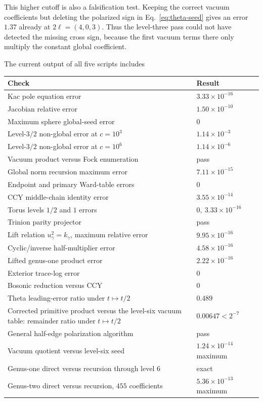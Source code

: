 \documentclass[11pt]{article}
\begin{document}
This higher cutoff is also a falsification test.  Keeping the correct vacuum
coefficients but deleting the polarized sign in
Eq.~\eqref{eq:theta-seed} gives an error \(1.37\) already at
\(2\bm\ell=(4,0,3)\).  Thus the level-three pass could not have detected the
missing cross sign, because the first vacuum terms there only multiply the
constant global coefficient.

The current output of all five scripts includes
\begin{center}
\begin{tabular}{@{}L{0.67\textwidth}l@{}}
\toprule
Check & Result\\
\midrule
Kac pole equation error & \(3.33\times10^{-16}\)\\
Jacobian relative error & \(1.50\times10^{-10}\)\\
Maximum sphere global-seed error & \(0\)\\
Level-\(3/2\) non-global error at \(c=10^3\) & \(1.14\times10^{-3}\)\\
Level-\(3/2\) non-global error at \(c=10^6\) & \(1.14\times10^{-6}\)\\
Vacuum product versus Fock enumeration & pass\\
Global norm recursion maximum error & \(7.11\times10^{-15}\)\\
Endpoint and primary Ward-table errors & \(0\)\\
CCY middle-chain identity error & \(3.55\times10^{-14}\)\\
Torus levels \(1/2\) and \(1\) errors
& \(0,\ 3.33\times10^{-16}\)\\
Trinion parity projector & pass\\
Lift relation \(u_\gamma^2=k_\gamma\), maximum relative error
& \(9.95\times10^{-16}\)\\
Cyclic/inverse half-multiplier error & \(4.58\times10^{-16}\)\\
Lifted genus-one product error & \(2.22\times10^{-16}\)\\
Exterior trace-log error & \(0\)\\
Bosonic reduction versus CCY & \(0\)\\
Theta leading-error ratio under \(t\mapsto t/2\) & \(0.489\)\\
Corrected primitive product versus the level-six vacuum table:
remainder ratio under \(t\mapsto t/2\) & \(0.00647<2^{-7}\)\\
General half-edge polarization algorithm & pass\\
Vacuum quotient versus level-six seed & \(1.24\times10^{-14}\) maximum\\
Genus-one direct versus recursion through level \(6\) & exact\\
Genus-two direct versus recursion, \(455\) coefficients
& \(5.36\times10^{-13}\) maximum\\
\bottomrule
\end{tabular}
\end{center}
\end{document}

